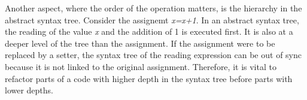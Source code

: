 Another aspect, where the order of the operation matters, is the hierarchy in the abstract syntax tree. Consider the assignemt \textit{x=x+1}. In an abstract syntax tree, the reading of the value \textit{x} and the addition of 1 is executed first. It is also at a deeper level of the tree than the assignment. If the assignment were to be replaced by a setter, the syntax tree of the reading expression can be out of sync because it is not linked to the original assignment. Therefore, it is vital to refactor parts of a code with higher depth in the syntax tree before parts with lower depths. 

\begin{comment}
\subsection{ChatGPT}
ChatGPT is another approach to detect data clumps as it can process code easily and report data clumps in any format the user wants. It also supports many programming languages that other tools do not provide.

However, ChatGPT has a limited context size, so processing large projects is  either too costly or simply not possible.

Giving ChatGPT the right instructions to find data clumps can also be challenging. While ChatGPT can define and find some data clumps without further context, it is better to give it a precise definition to work with. The following definition leads to good result, however it cannot be guaranteed that this will work forever:


A data clump exists
\begin{enumerate}
   
   \item if at least three fields also exists in another class
   \item if at least three fields also exists as method parameters in some method
    \item if two methods have at least three common parameters
\end{enumerate}
\end{comment}